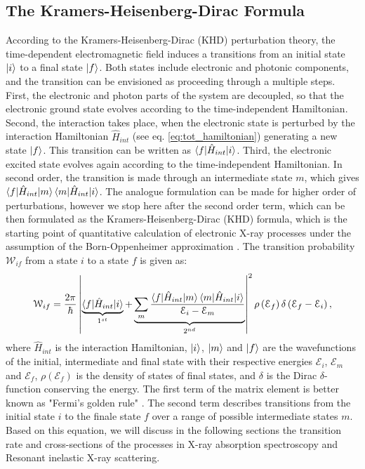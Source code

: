 \subsection{The Kramers-Heisenberg-Dirac Formula}
According to the Kramers-Heisenberg-Dirac (KHD) perturbation theory, the time-dependent electromagnetic field induces a transitions from an initial state $\ket{i}$ to a final state $\ket{f}$. Both states include electronic and photonic components, and the transition can be envisioned as proceeding through a multiple steps. First, the electronic and photon parts of the system are decoupled, so that the electronic ground state evolves according to the time-independent Hamiltonian. Second, the interaction takes place, when the electronic state is perturbed by the interaction Hamiltonian $\hat{H}_{int}$ (see eq. \ref{eq:tot_hamiltonian}) generating a new state $\ket{f}$. This transition can be written as $\braket{f|\hat{H}_{int}|i}$. Third, the electronic excited state evolves again according to the time-independent Hamiltonian. In second order, the transition is made through an intermediate state $m$, which gives $\braket{f|\hat{H}_{int}|m}\braket{m|\hat{H}_{int}|i}$. The analogue formulation can be made for higher order of perturbations, however we stop here after the second order term, which can be then formulated as the Kramers-Heisenberg-Dirac (KHD) formula, which is the starting point of quantitative calculation of electronic X-ray processes under the assumption of the Born-Oppenheimer approximation \cite{stohr2023nature}. The transition probability $\mathcal{W}_{if}$ from a state $i$ to a state $f$ is given as:
\begin{equation}
    \mathcal{W}_{if} = \frac{2\pi}{\hbar}\left|\underbrace{\braket{f|\hat{H}_{int}|i}}_{1^{st}}+\underbrace{\sum_{m}\frac{\braket{f|\hat{H}_{int}|m}\braket{m|\hat{H}_{int}|i}}{\mathcal{E}_{i}-\mathcal{E}_{m}}}_{2^{nd}}\right|^{2} \rho\left(\mathcal{E}_{f}\right)\delta\left(\mathcal{E}_{f}-\mathcal{E}_{i}\right),
    \label{eq:Kramers-Heisenberg-Dirac}
\end{equation}
where $\hat{H}_{int}$ is the interaction Hamiltonian, $\ket{i}$, $\ket{m}$ and $\ket{f}$ are the wavefunctions of the initial, intermediate and final state with their respective energies $\mathcal{E}_{i}$, $\mathcal{E}_{m}$ and $\mathcal{E}_{f}$, $\rho(\mathcal{E}_{f})$ is the density of states of final states, and $\delta$ is the Dirac $\delta$-function conserving the energy. The first term of the matrix element is better known as "Fermi's golden rule" \cite{fermi1932}. The second term describes transitions from the initial state $i$ to the finale state $f$ over a range of possible intermediate states $m$. Based on this equation, we will discuss in the following sections the transition rate and cross-sections of the processes in X-ray absorption spectroscopy and Resonant inelastic X-ray scattering.
